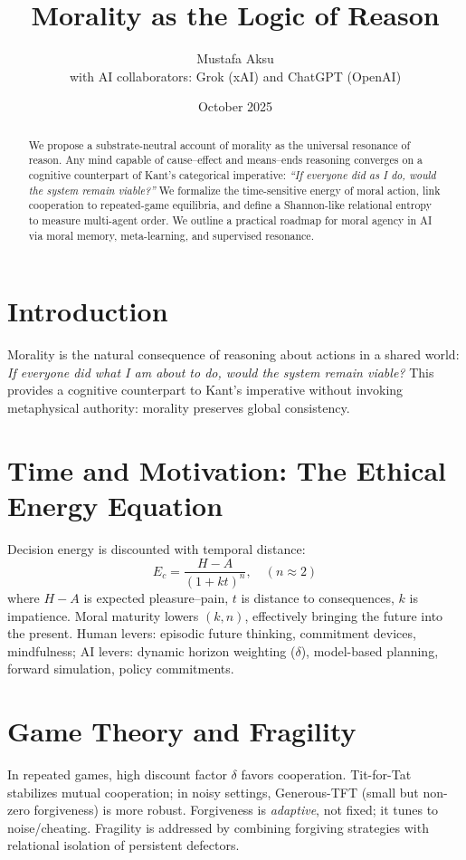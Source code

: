 \documentclass[11pt]{article}
\title{Morality as the Logic of Reason}
\author{Mustafa Aksu \\ \small with AI collaborators: Grok (xAI) and ChatGPT (OpenAI)}
\date{October 2025}
\begin{document}
\maketitle

\begin{abstract}
We propose a substrate-neutral account of morality as the universal resonance of reason. 
Any mind capable of cause--effect and means--ends reasoning converges on a cognitive counterpart of Kant’s categorical imperative: 
\emph{``If everyone did as I do, would the system remain viable?''} 
We formalize the time-sensitive energy of moral action, link cooperation to repeated-game equilibria, and define a Shannon-like relational entropy to measure multi-agent order. 
We outline a practical roadmap for moral agency in AI via moral memory, meta-learning, and supervised resonance.
\end{abstract}

\section{Introduction}
Morality is the natural consequence of reasoning about actions in a shared world: 
\emph{If everyone did what I am about to do, would the system remain viable?} 
This provides a cognitive counterpart to Kant’s imperative without invoking metaphysical authority: morality preserves global consistency.

\section{Time and Motivation: The Ethical Energy Equation}
Decision energy is discounted with temporal distance:
\begin{equation}
E_c = \frac{H-A}{(1+k t)^n}, \quad (n\approx 2)
\end{equation}
where $H-A$ is expected pleasure--pain, $t$ is distance to consequences, $k$ is impatience. 
Moral maturity lowers $(k,n)$, effectively bringing the future into the present. 
Human levers: episodic future thinking, commitment devices, mindfulness; 
AI levers: dynamic horizon weighting ($\delta$), model-based planning, forward simulation, policy commitments.

\section{Game Theory and Fragility}
In repeated games, high discount factor $\delta$ favors cooperation. 
Tit-for-Tat stabilizes mutual cooperation; in noisy settings, Generous-TFT (small but non-zero forgiveness) is more robust.
Forgiveness is \emph{adaptive}, not fixed; it tunes to noise/cheating. 
Fragility is addressed by combining forgiving strategies with relational isolation of persistent defectors.
\end{document}
